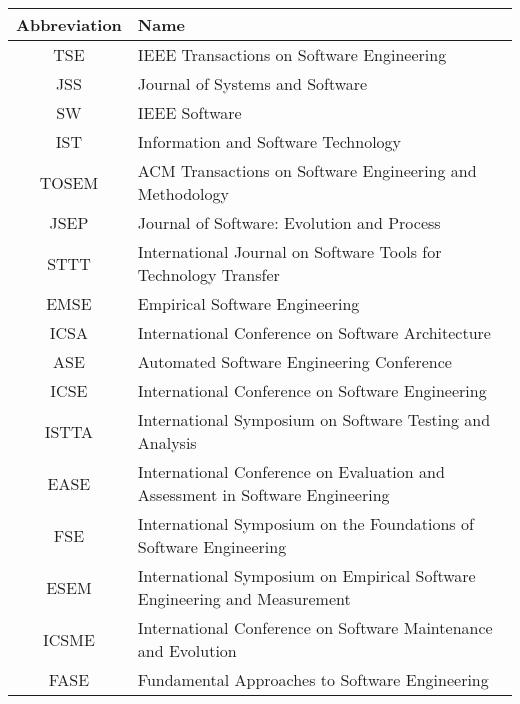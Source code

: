 \documentclass[a4paper]{article}
\begin{document}
    \begin{center}
        \begin{tabular}{|c|l|}
            \hline
            Abbreviation & Name \\
            \hline
            TSE & IEEE Transactions on Software Engineering \\
            \hline
            JSS & Journal of Systems and Software \\
            \hline
            SW & IEEE Software \\
            \hline
            IST & Information and Software Technology \\
            \hline
            TOSEM & ACM Transactions on Software Engineering and Methodology \\
            \hline
            JSEP & Journal of Software: Evolution and Process \\
            \hline
            STTT & International Journal on Software Tools for Technology Transfer \\
            \hline
            EMSE & Empirical Software Engineering \\
            \hline
            ICSA & International Conference on Software Architecture \\
            \hline
            ASE & Automated Software Engineering Conference \\
            \hline
            ICSE & International Conference on Software Engineering \\ \hline
            ISTTA & International Symposium on Software Testing and Analysis \\ \hline
            EASE & International Conference on Evaluation and Assessment in Software Engineering \\
            \hline
            FSE & International Symposium on the Foundations of Software Engineering \\
            \hline
            ESEM & International Symposium on Empirical Software Engineering and Measurement \\
            \hline
            ICSME & International Conference on Software Maintenance and Evolution \\ \hline
            FASE & Fundamental Approaches to Software Engineering \\ \hline

        \end{tabular}
    \end{center}
\end{document}
